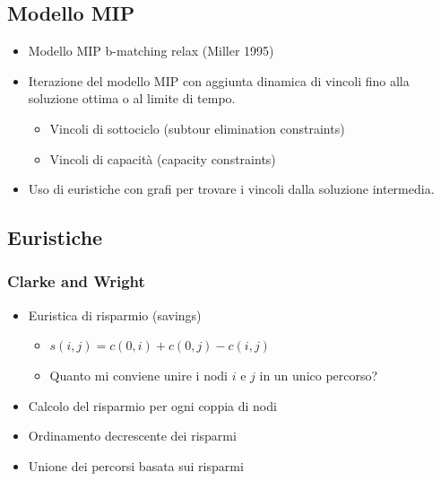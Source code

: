 \documentclass[compress]{beamer}
\begin{document}
\subsection{Modello MIP}
\begin{frame}{\subsecname}
    \begin{itemize}
        \item Modello MIP b-matching relax (Miller 1995)
        \item Iterazione del modello MIP con aggiunta dinamica di vincoli fino alla soluzione ottima o al limite di tempo.
        \begin{itemize}
            \item Vincoli di sottociclo (subtour elimination constraints) 
            \item Vincoli di capacità (capacity constraints)
        \end{itemize}
        \item Uso di euristiche con grafi per trovare i vincoli dalla soluzione intermedia.
    \end{itemize}
\end{frame}

\subsection{Euristiche}

\subsubsection{Clarke and Wright}
    
\begin{frame}{\subsubsecname}
    \begin{itemize}
        \item Euristica di risparmio (savings)
        \begin{itemize}
            \item \( s(i,j) = c(0,i) + c(0,j) - c(i,j) \)
            \item Quanto mi conviene unire i nodi \(i\) e \(j\) in un unico percorso?
        \end{itemize}
        \item Calcolo del risparmio per ogni coppia di nodi
        \item Ordinamento decrescente dei risparmi
        \item Unione dei percorsi basata sui risparmi
    \end{itemize}

\end{frame}
\end{document}
